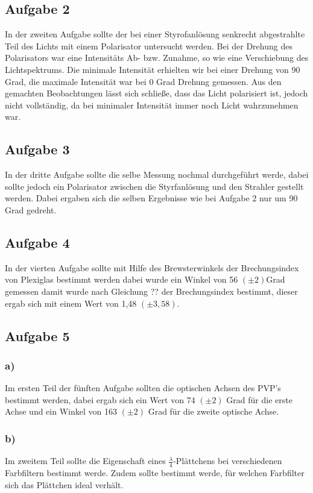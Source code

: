 \documentclass[12pt]{scrartcl}
\begin{document}
\subsection{Aufgabe 2}
In der zweiten Aufgabe sollte der bei einer Styrofanlösung senkrecht abgestrahlte Teil des Lichts mit einem Polarisator untersucht werden. Bei der Drehung des Polarisators war eine Intensitäts Ab- bzw. Zunahme, so wie eine Verschiebung des Lichtspektrums. Die minimale Intensität erhielten wir bei einer Drehung von 90 Grad, die maximale Intensität war bei 0 Grad Drehung gemessen. Aus den gemachten Beobachtungen lässt sich schließe, dass das Licht polarisiert ist, jedoch nicht vollständig, da bei minimaler Intensität immer noch Licht wahrzunehmen war.

\subsection{Aufgabe 3}
In der dritte Aufgabe sollte die selbe Messung nochmal durchgeführt werde, dabei sollte jedoch ein Polarisator zwischen die Styrfanlösung und den Strahler gestellt werden. Dabei ergaben sich die selben Ergebnisse wie bei Aufgabe 2 nur um 90 Grad gedreht.


\subsection{Aufgabe 4}
In der vierten Aufgabe sollte mit Hilfe des Brewsterwinkels der Brechungsindex von Plexiglas bestimmt werden dabei wurde ein Winkel von 56 $(\pm 2)$Grad gemessen damit wurde nach Gleichung ?? der Brechungsindex bestimmt, dieser ergab sich mit einem Wert von 1,48 $(\pm3,58)$.

\subsection{Aufgabe 5}

\subsubsection{a)}
Im ersten Teil der fünften Aufgabe sollten die optischen Achsen des PVP's bestimmt werden, dabei ergab sich ein Wert von 74 $(\pm 2)$ Grad für die erste Achse und ein Winkel von 163 $(\pm 2)$ Grad für die zweite optische Achse.

\subsubsection{b)}
Im zweitem Teil sollte die Eigenschaft eines $\frac{\lambda}{4}$-Plättchens bei verschiedenen Farbfiltern bestimmt werde. Zudem sollte bestimmt werde, für welchen Farbfilter sich das Plättchen ideal verhält.
\end{document}
